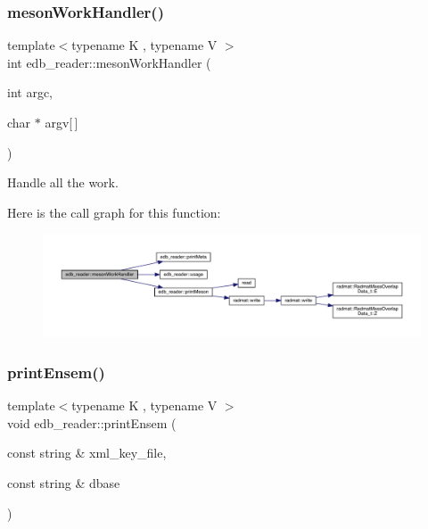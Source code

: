 \mbox{\label{namespaceedb__reader_acbef2e39b69c0ac895a7f37a12f9ed47}} 
\subsubsection{\texorpdfstring{mesonWorkHandler()}{mesonWorkHandler()}\hspace{0.1cm}{\footnotesize\ttfamily [2/2]}}
{\footnotesize\ttfamily template$<$typename K , typename V $>$ \\
int edb\+\_\+reader\+::meson\+Work\+Handler (\begin{DoxyParamCaption}\item[{int}]{argc,  }\item[{char $\ast$}]{argv\mbox{[}$\,$\mbox{]} }\end{DoxyParamCaption})}



Handle all the work. 

Here is the call graph for this function\+:
\nopagebreak
\begin{figure}[H]
\begin{center}
\leavevmode
\includegraphics[width=350pt]{d8/d4f/namespaceedb__reader_acbef2e39b69c0ac895a7f37a12f9ed47_cgraph}
\end{center}
\end{figure}
\mbox{\label{namespaceedb__reader_ae02dd53c91dd84ab984521559b49306f}} 
\subsubsection{\texorpdfstring{printEnsem()}{printEnsem()}}
{\footnotesize\ttfamily template$<$typename K , typename V $>$ \\
void edb\+\_\+reader\+::print\+Ensem (\begin{DoxyParamCaption}\item[{const string \&}]{xml\+\_\+key\+\_\+file,  }\item[{const string \&}]{dbase }\end{DoxyParamCaption})}



